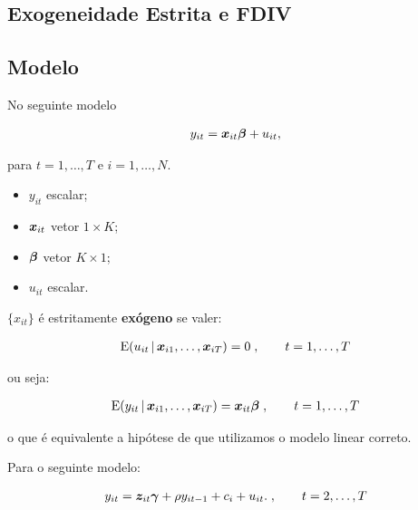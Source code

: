 \documentclass[11pt, oneside, a4paper, article]{article}
\numberwithin{equation}{section}
\begin{document}
\begin{description}
\clearpage
\section{Exogeneidade Estrita e FDIV}


\subsection{Modelo}

No seguinte modelo

\vspace{-1 em}
\begin{align*} 
y_{it} = \boldsymbol{x}_{it} \boldsymbol{\beta} + u_{it},
\end{align*}

\noindent
para
$t = 1, \dots, T$ e $i = 1, \dots, N$.

\begin{itemize}\itemsep0pt
\item
$y_{it}$ escalar;

\item
$\boldsymbol{x}_{it}$  vetor $1 \times K$;

\item
$\boldsymbol{\beta}$ vetor $K \times 1$;

\item
$u_{it}$ escalar.
\end{itemize}

\noindent
$\{x_{it}\}$ é estritamente \textbf{exógeno} se valer:

\vspace{-1 em}
\begin{align*}
\text{E}( u_{it} \, | \, \boldsymbol{x}_{i1}, \dots, \boldsymbol{x}_{iT} ) = 0 \; , \qquad t = 1, \dots, T
\end{align*}

\noindent
ou seja:

\vspace{-1 em}
\begin{align*}
\text{E}( y_{it} \, | \, \boldsymbol{x}_{i1}, \dots, \boldsymbol{x}_{iT} ) = \boldsymbol{x}_{it} \boldsymbol{\beta} 
\; , \qquad t = 1, \dots, T
\end{align*}

\noindent
o que é equivalente a hipótese de que utilizamos o modelo linear correto.

Para o seguinte modelo:

\vspace{-1.5 em}
\begin{align*}
y_{it} = \boldsymbol{z}_{it} \boldsymbol{\gamma} + \rho y_{i t - 1} + c_{i} + u_{it}.
\; , \qquad t = 2, \dots, T
\end{align*}


\end{description}
\end{document}
